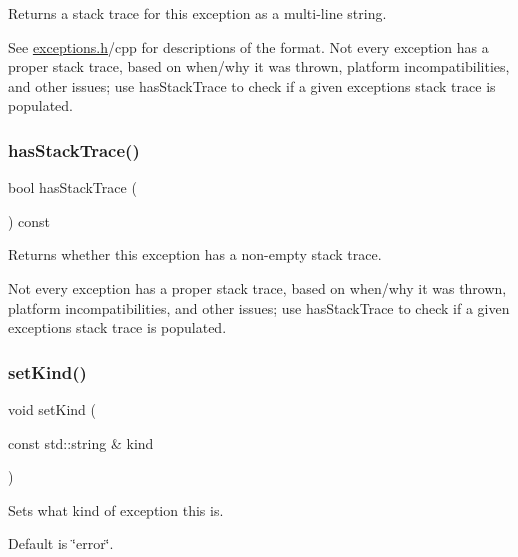 Returns a stack trace for this exception as a multi-\/line string. 

See \mbox{\hyperlink{exceptions_8h_source}{exceptions.\+h}}/cpp for descriptions of the format. Not every exception has a proper stack trace, based on when/why it was thrown, platform incompatibilities, and other issues; use has\+Stack\+Trace to check if a given exception\textquotesingle{}s stack trace is populated. \mbox{\label{classErrorException_ae7ccac41c27ba02a30bdec527db0a639}} 
\subsubsection{\texorpdfstring{has\+Stack\+Trace()}{hasStackTrace()}}
{\footnotesize\ttfamily bool has\+Stack\+Trace (\begin{DoxyParamCaption}{ }\end{DoxyParamCaption}) const\hspace{0.3cm}{\ttfamily [virtual]}}



Returns whether this exception has a non-\/empty stack trace. 

Not every exception has a proper stack trace, based on when/why it was thrown, platform incompatibilities, and other issues; use has\+Stack\+Trace to check if a given exception\textquotesingle{}s stack trace is populated. \mbox{\label{classErrorException_a896ae13e5a5b1b89f058f7de9697c3cd}} 
\subsubsection{\texorpdfstring{set\+Kind()}{setKind()}}
{\footnotesize\ttfamily void set\+Kind (\begin{DoxyParamCaption}\item[{const std\+::string \&}]{kind }\end{DoxyParamCaption})}



Sets what kind of exception this is. 

Default is \char`\"{}error\char`\"{}. \mbox{\label{classErrorException_aaac5126664da146aa7290235ac7b1d07}} 
